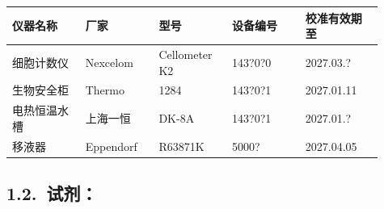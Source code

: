 \documentclass[UTF8,10pt,a4paper,fontset=fandol]{ctexart}
\newcommand{\fieldvalue}[1]{#1}
\newcommand{\handwritten}[1]{#1}
\begin{document}
\begin{center}
\small
\begin{tabular}{|p{0.18\linewidth}|p{0.18\linewidth}|p{0.18\linewidth}|p{0.18\linewidth}|p{0.19\linewidth}|}
\hline
仪器名称 & 厂家 & 型号 & 设备编号 & 校准有效期至\\
\hline
细胞计数仪 &
\fieldvalue{Nexcelom} &
\fieldvalue{Cellometer K2} &
\fieldvalue{\handwritten{143?0?0}} &
\fieldvalue{\handwritten{2027.03.?}}\\
\hline
生物安全柜 &
\fieldvalue{Thermo} &
\fieldvalue{\handwritten{1284}} &
\fieldvalue{\handwritten{143?0?1}} &
\fieldvalue{\handwritten{2027.01.11}}\\
\hline
电热恒温水槽 &
\fieldvalue{上海一恒} &
\fieldvalue{\handwritten{DK-8A}} &
\fieldvalue{\handwritten{143?0?1}} &
\fieldvalue{\handwritten{2027.01.?}}\\
\hline
移液器 &
\fieldvalue{Eppendorf} &
\fieldvalue{\handwritten{R63871K}} &
\fieldvalue{\handwritten{5000?}} &
\fieldvalue{\handwritten{2027.04.05}}\\
\hline
\end{tabular}
\end{center}

\subsection*{1.2.\ 试剂：}
\end{document}
